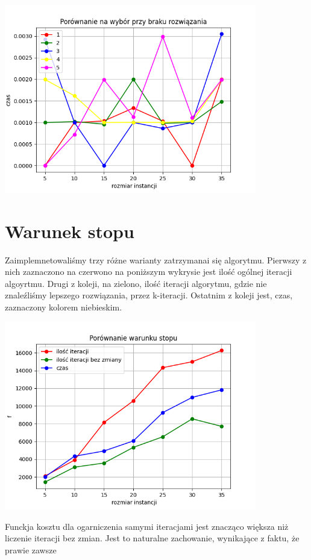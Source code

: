 \documentclass{article}
\begin{document}
    \includegraphics[width=11cm]{./spr2img/Figure_7.png}

    \section{Warunek stopu}

    Zaimplemnetowaliśmy trzy różne warianty zatrzymanai się algorytmu.
    Pierwszy z nich zaznaczono na czerwono na poniższym wykrysie jest ilość ogólnej
    iteracji algoyrtmu. Drugi z koleji, na zielono, ilość iteracji algorytmu, gdzie
    nie znaleźliśmy lepszego rozwiązania, przez k-iteracji. Ostatnim z koleji jest, czas,
    zaznaczony kolorem niebieskim.

    \includegraphics[width=11cm]{./spr2img/Figure_8.png}

    Funckja kosztu dla ogarniczenia samymi iteracjami jest znacząco większa niż liczenie
    iteracji bez zmian. Jest to naturalne zachowanie, wynikające z faktu, że prawie zawsze
\end{document}
